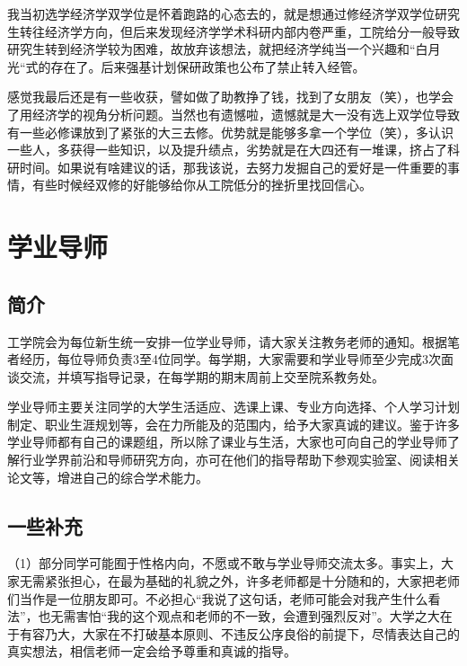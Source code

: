 \documentclass[11pt,oneside]{book}
\begin{document}
\vspace{10pt}

我当初选学经济学双学位是怀着跑路的心态去的，就是想通过修经济学双学位研究生转往经济学方向，但后来发现经济学学术科研内部内卷严重，工院给分一般导致研究生转到经济学较为困难，故放弃该想法，就把经济学纯当一个兴趣和“白月光“式的存在了。后来强基计划保研政策也公布了禁止转入经管。

\vspace{10pt}

感觉我最后还是有一些收获，譬如做了助教挣了钱，找到了女朋友（笑），也学会了用经济学的视角分析问题。当然也有遗憾啦，遗憾就是大一没有选上双学位导致有一些必修课放到了紧张的大三去修。优势就是能够多拿一个学位（笑），多认识一些人，多获得一些知识，以及提升绩点，劣势就是在大四还有一堆课，挤占了科研时间。如果说有啥建议的话，那我该说，去努力发掘自己的爱好是一件重要的事情，有些时候经双修的好能够给你从工院低分的挫折里找回信心。

\section{学业导师}

\subsection{简介}

工学院会为每位新生统一安排一位学业导师，请大家关注教务老师的通知。根据笔者经历，每位导师负责3至4位同学。每学期，大家需要和学业导师至少完成3次面谈交流，并填写指导记录，在每学期的期末周前上交至院系教务处。

\vspace{10pt}

学业导师主要关注同学的大学生活适应、选课上课、专业方向选择、个人学习计划制定、职业生涯规划等，会在力所能及的范围内，给予大家真诚的建议。鉴于许多学业导师都有自己的课题组，所以除了课业与生活，大家也可向自己的学业导师了解行业学界前沿和导师研究方向，亦可在他们的指导帮助下参观实验室、阅读相关论文等，增进自己的综合学术能力。

\subsection{一些补充}

（1）部分同学可能囿于性格内向，不愿或不敢与学业导师交流太多。事实上，大家无需紧张担心，在最为基础的礼貌之外，许多老师都是十分随和的，大家把老师们当作是一位朋友即可。不必担心“我说了这句话，老师可能会对我产生什么看法”，也无需害怕“我的这个观点和老师的不一致，会遭到强烈反对”。大学之大在于有容乃大，大家在不打破基本原则、不违反公序良俗的前提下，尽情表达自己的真实想法，相信老师一定会给予尊重和真诚的指导。
\end{document}
